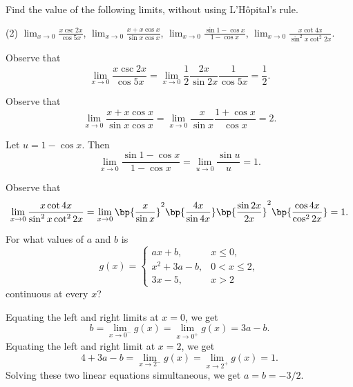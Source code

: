 \clearpage
\begin{problem}
    Find the value of the following limits, without using L'H\^{o}pital's rule.

    \begin{tasks}(2)
        \task $\displaystyle\lim_{x \to 0} \frac{x \csc 2x}{\cos 5x}$,
        \task $\displaystyle\lim_{x \to 0} \frac{x + x \cos x}{\sin x \cos x}$,
        \task $\displaystyle\lim_{x \to 0} \frac{\sin{1 - \cos x}}{1 - \cos x}$,
        \task $\displaystyle\lim_{x \to 0} \frac{x \cot 4x}{\sin^2 x \cot^2 2x}$.
    \end{tasks}
\end{problem}
\begin{solution}
    \begin{ppart}
        Observe that \[\lim_{x \to 0} \frac{x \csc 2x}{\cos 5x} = \lim_{x \to 0} \frac12 \frac{2x}{\sin 2x} \frac1{\cos 5x} = \frac12.\]
    \end{ppart}
    \begin{ppart}
        Observe that \[\lim_{x \to 0} \frac{x + x \cos x}{\sin x \cos x} = \lim_{x \to 0} \frac{x}{\sin x} \frac{1 + \cos x}{\cos x} = 2.\]
    \end{ppart}
    \begin{ppart}
        Let $u = 1 - \cos x$. Then \[\lim_{x \to 0} \frac{\sin{1 - \cos x}}{1 - \cos x} = \lim_{u \to 0} \frac{\sin u}{u} = 1.\]
    \end{ppart}
    \begin{ppart}
        Observe that \[\lim_{x \to 0} \frac{x \cot 4x}{\sin^2 x \cot^2 2x} = \lim_{x \to 0} \bp{\frac{x}{\sin x}}^2 \bp{\frac{4x}{\sin 4x}} \bp{\frac{\sin 2x}{2x}}^2 \bp{\frac{\cos 4x}{\cos^2 2x}} = 1.\]
    \end{ppart}
\end{solution}

\begin{problem}
    For what values of $a$ and $b$ is \[g(x) = \begin{cases}
        ax + b, & x \leq 0,\\
        x^2 + 3a - b, & 0 < x \leq 2,\\
        3x - 5, & x > 2
    \end{cases}\] continuous at every $x$?
\end{problem}
\begin{solution}
    Equating the left and right limits at $x = 0$, we get \[b = \lim_{x \to 0^-} g(x) = \lim_{x \to 0^+} g(x) = 3a - b.\] Equating the left and right limit at $x = 2$, we get \[4 + 3a - b = \lim_{x \to 2^-} g(x) = \lim_{x \to 2^+} g(x) = 1.\] Solving these two linear equations simultaneous, we get $a = b = -3/2$.
\end{solution}

